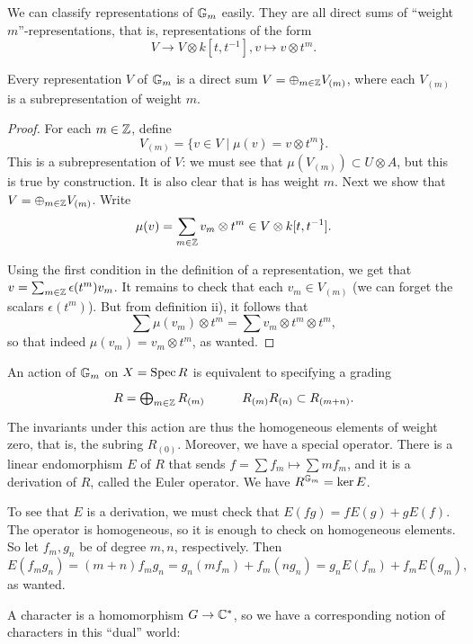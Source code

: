 \documentclass[11pt, english]{article}
\begin{document}
We can classify representations of $\mathbb{G}_m$ easily. They are all direct sums of ``weight $m$''-representations, that is, representations of the form $$V \to V \otimes k[t, t^{-1}], v \mapsto v \otimes t^m.$$ 

\begin{prop}
\label{propgm}
 Every representation $V$ of $\mathbb{G}_m$ is a direct sum $V = \oplus_{m \in \mathbb{Z}} V_{(m)}$, where each $V_{(m)}$ is a subrepresentation of weight $m$. 
\end{prop}

\begin{proof}
For each $m \in \mathbb{Z}$, define
\[
V_{(m)} = \{ v \in V \mid \mu(v) = v \otimes t^m \}.
\]
This is a subrepresentation of $V$: we must see that $\mu(V_{(m)}) \subset U \otimes A$, but this is true by construction. It is also clear that is has weight $m$. Next we show that $V = \oplus_{m \in \mathbb{Z}} V_{(m)}$. Write
\[
\mu(v) = \sum_{m \in \mathbb{Z}} v_m \otimes t^m \in V \otimes k[t,t^{-1}].
\]

Using the first condition in the definition of a representation, we get that $v = \sum_{m \in \mathbb{Z}} \epsilon(t^m)v_m$. It remains to check that each $v_m \in V_{(m)}$ (we can forget the scalars $\epsilon(t^m)$). But from definition ii), it follows that
\[
\sum \mu(v_m) \otimes t^m = \sum v_m \otimes t^m \otimes t^m,
\]
so that indeed $\mu(v_m)= v_m \otimes t^m$, as wanted.
\end{proof}

\begin{example}
An action of $\mathbb{G}_m$ on $X = \operatorname{Spec} R$ is equivalent to specifying a grading
\[
\xymatrix{
R = \bigoplus_{m \in \Z} R_{(m)} & R_{(m)}R_{(n)} \subset R_{(m+n)}.
}
\]
The invariants under this action are thus the homogeneous elements of weight zero, that is, the subring $R_{(0)}$. Moreover, we have a special operator. There is a linear endomorphism $E$ of $R$ that sends $f = \sum f_m \mapsto \sum m f_m$, and it is a derivation of $R$, called the Euler operator. We have $R^{\mathbb{G}_m}=\ker E$.

To see that $E$ is a derivation, we must check that $E(fg)=fE(g)+gE(f)$. The operator is homogeneous, so it is enough to check on homogeneous elements. So let $f_m,g_n$ be of degree $m,n$, respectively. Then
\[
E(f_mg_n)=(m+n)f_mg_n = g_n(mf_m)+f_m(ng_n)=g_nE(f_m)+f_mE(g_m),
\]
as wanted.
\end{example}


A character is a homomorphism $G \to \mathbb{C}^\ast$, so we have a corresponding notion of characters in this ``dual'' world:
\end{document}
